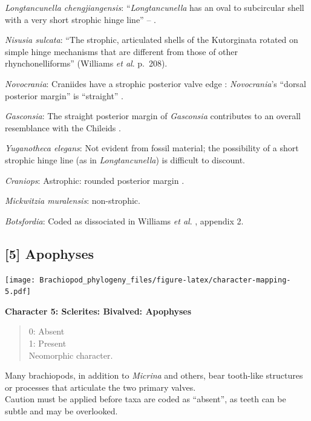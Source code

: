 \documentclass[]{book}
\theoremstyle{definition}
\theoremstyle{definition}
\theoremstyle{definition}
\theoremstyle{remark}
\begin{document}
\emph{Longtancunella chengjiangensis}: ``\emph{Longtancunella} has an
oval to subcircular shell with a very short strophic hinge line'' --
\citet{Zhang2011Theexceptionally}.

\emph{Nisusia sulcata}: ``The strophic, articulated shells of the
Kutorginata rotated on simple hinge mechanisms that are different from
those of other rhynchonelliforms'' (Williams \emph{et al}. p.~208).

\emph{Novocrania}: Craniides have a strophic posterior valve edge
\citep[table 39 on p.~2853]{Williams2007PartH}: \emph{Novocrania}'s
``dorsal posterior margin'' is ``straight''
\citep[p.~171]{Williams2000BrachiopodaLinguliformea}.

\emph{Gasconsia}: The straight posterior margin of \emph{Gasconsia}
contributes to an overall resemblance with the Chileids
\citep{Holmer2014OrdovicianSilurian}.

\emph{Yuganotheca elegans}: Not evident from fossil material; the
possibility of a short strophic hinge line (as in \emph{Longtancunella})
is difficult to discount.

\emph{Craniops}: Astrophic: rounded posterior margin \citep[see fig. 91
in][]{Williams2000BrachiopodaLinguliformea}.

\emph{Mickwitzia muralensis}: non-strophic.

\emph{Botsfordia}: Coded as dissociated in Williams \emph{et al}.
\citeyearpar{Williams1998Thediversity}, appendix 2.

\hypertarget{apophyses}{%
\subsection*{{[}5{]} Apophyses}\label{apophyses}}

\texttt{[image: Brachiopod\_phylogeny\_files/figure-latex/character-mapping-5.pdf]}

\textbf{Character 5: Sclerites: Bivalved: Apophyses}

\begin{quote}
0: Absent\\
1: Present\\
Neomorphic character.
\end{quote}

Many brachiopods, in addition to \emph{Micrina} and others, bear
tooth-like structures or processes that articulate the two primary
valves.\\
Caution must be applied before taxa are coded as ``absent'', as teeth
can be subtle and may be overlooked.
\end{document}

